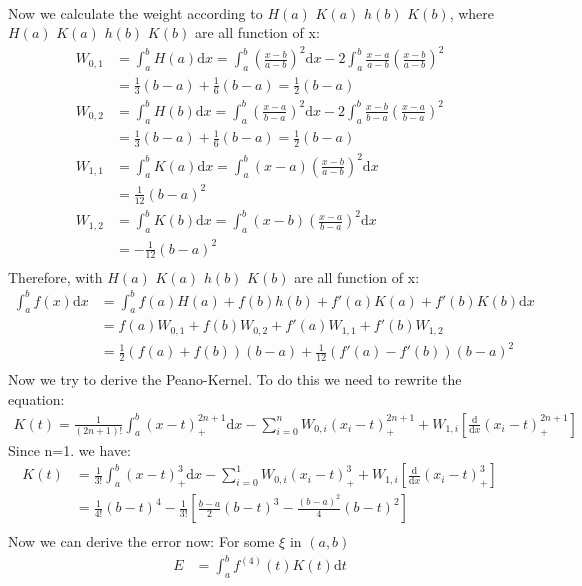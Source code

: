 \documentclass[12pt]{article}
\begin{document}
\begin{enumerate}
\begin{align*}
\end{align*}
Now we calculate the weight according to $H(a)$ $K(a)$ $h(b)$ $K(b)$, where $H(a)$ $K(a)$ $h(b)$ $K(b)$ are all function of x:
\begin{align*}
W_{0,1}&=\int_a^b H(a)\mathrm{d}x=\int_a^b (\frac{x-b}{a-b})^{2}\mathrm{d}x-2\int_a^b \frac{x-a}{a-b}(\frac{x-b}{a-b})^{2}\\
&=\frac{1}{3}(b-a)+\frac{1}{6}(b-a)=\frac{1}{2}(b-a)\\
W_{0,2}&=\int_a^b H(b)\mathrm{d}x=\int_a^b (\frac{x-a}{b-a})^{2}\mathrm{d}x-2\int_a^b \frac{x-b}{b-a}(\frac{x-a}{b-a})^{2}\\
&=\frac{1}{3}(b-a)+\frac{1}{6}(b-a)=\frac{1}{2}(b-a)\\
W_{1,1}&=\int_a^b K(a)\mathrm{d}x=\int_a^b (x-a)(\frac{x-b}{a-b})^{2}\mathrm{d}x\\
&=\frac{1}{12}(b-a)^{2}\\
W_{1,2}&=\int_a^b K(b)\mathrm{d}x=\int_a^b (x-b)(\frac{x-a}{b-a})^{2}\mathrm{d}x\\
&=-\frac{1}{12}(b-a)^{2}\\
\end{align*}
Therefore, with $H(a)$ $K(a)$ $h(b)$ $K(b)$ are all function of x:
\begin{align*}
\int_a^b f(x)\mathrm{d}x&=\int_a^b f(a)H(a)+f(b)h(b)+f'(a)K(a)+f'(b)K(b)\mathrm{d}x\\
&=f(a)W_{0,1}+f(b)W_{0,2}+f'(a)W_{1,1}+f'(b)W_{1,2}\\
&=\frac{1}{2}(f(a)+f(b))(b-a)+\frac{1}{12}(f'(a)-f'(b))(b-a)^2\\
\end{align*}
Now we try to derive the Peano-Kernel. To do this we need to rewrite the equation:
\begin{align*}
K(t)=\frac{1}{(2n+1)!}\int_a^b (x-t)_{+}^{2n+1}\mathrm{d}x-\sum_{i=0}^{n} W_{0,i}(x_i-t)_{+}^{2n+1}+ W_{1,i} [\frac{\mathrm{d}}{\mathrm{d}x}(x_i-t)_{+}^{2n+1}]
\end{align*}
Since n=1. we have:
\begin{align*}
K(t) &=\frac{1}{3!}\int_a^b (x-t)_{+}^{3}\mathrm{d}x-\sum_{i=0}^{1} W_{0,i}(x_i-t)_{+}^{3}+  W_{1,i}[\frac{\mathrm{d}}{\mathrm{d}x}(x_i-t)_{+}^{3}]\\
&= \frac{1}{4!}(b-t)^{4}-\frac{1}{3!}[\frac{b-a}{2}(b-t)^3-\frac{(b-a)^2}{4}(b-t)^2]\\
\end{align*}
Now we can derive the error now: For some $\xi$ in $(a,b)$
\begin{align*}
E&=\int_a^b f^{(4)}(t)K(t)\mathrm{d}t\\

\end{align*}
\end{enumerate}
\end{document}
